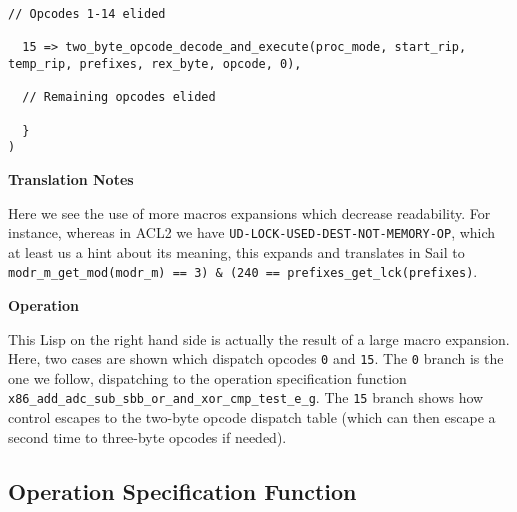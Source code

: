 \documentclass[a4paper]{article}
\begin{document}
\begin{tcolorbox}[breakable]
\begin{parcolumns}{2}
{\begin{lstlisting}[language=sail]
  // Opcodes 1-14 elided

  15 => two_byte_opcode_decode_and_execute(proc_mode, start_rip, temp_rip, prefixes, rex_byte, opcode, 0),

  // Remaining opcodes elided

  }
)
\end{lstlisting}
}
\colplacechunks
\end{parcolumns}

\textbf{Translation Notes}

Here we see the use of more macros expansions which decrease readability.  For instance, whereas in ACL2 we have \texttt{UD-LOCK-USED-DEST-NOT-MEMORY-OP}, which at least us a hint about its meaning, this expands and translates in Sail to \texttt{modr\_m\_get\_mod(modr\_m) == 3) \& (240 == prefixes\_get\_lck(prefixes)}.

\textbf{Operation}

This Lisp on the right hand side is actually the result of a large macro expansion.  Here, two cases are shown which dispatch opcodes \texttt{0} and \texttt{15}.  The \texttt{0} branch is the one we follow, dispatching to the operation specification function \texttt{x86\_add\_adc\_sub\_sbb\_or\_and\_xor\_cmp\_test\_e\_g}.  The \texttt{15} branch shows how control escapes to the two-byte opcode dispatch table (which can then escape a second time to three-byte opcodes if needed).

\end{tcolorbox}

\subsection{Operation Specification Function}
\end{document}
